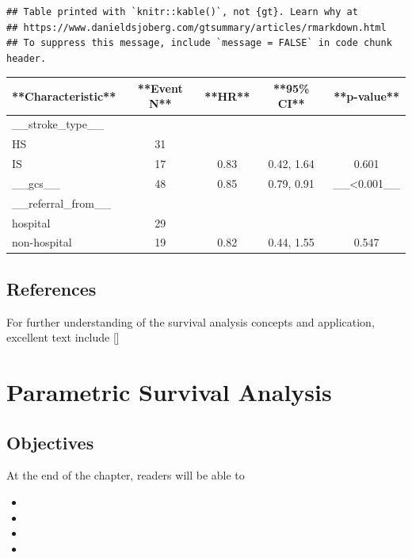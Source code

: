 \documentclass[
  10pt,
]{krantz}
\providecommand{\tightlist}{%
  \setlength{\itemsep}{0pt}\setlength{\parskip}{0pt}}
\begin{document}
\begin{verbatim}
## Table printed with `knitr::kable()`, not {gt}. Learn why at
## https://www.danieldsjoberg.com/gtsummary/articles/rmarkdown.html
## To suppress this message, include `message = FALSE` in code chunk header.
\end{verbatim}

\begin{tabular}{l|c|c|c|c}
\hline
**Characteristic** & **Event N** & **HR** & **95\% CI** & **p-value**\\
\hline
\_\_stroke\_type\_\_ &  &  &  & \\
\hline
HS & 31 &  &  & \\
\hline
IS & 17 & 0.83 & 0.42, 1.64 & 0.601\\
\hline
\_\_gcs\_\_ & 48 & 0.85 & 0.79, 0.91 & \_\_<0.001\_\_\\
\hline
\_\_referral\_from\_\_ &  &  &  & \\
\hline
hospital & 29 &  &  & \\
\hline
non-hospital & 19 & 0.82 & 0.44, 1.55 & 0.547\\
\hline
\end{tabular}

\hypertarget{references}{%
\section{References}\label{references}}

For further understanding of the survival analysis concepts and application, excellent text include {[}\citet{Lemeshow_Stanley2008-03-07}{]}\citep{survival-book}

\hypertarget{parametric-survival-analysis}{%
\chapter{Parametric Survival Analysis}\label{parametric-survival-analysis}}

\hypertarget{objectives-10}{%
\section{Objectives}\label{objectives-10}}

At the end of the chapter, readers will be able to

\begin{itemize}
\tightlist
\item
\item
\item
\item
\end{itemize}
\end{document}

